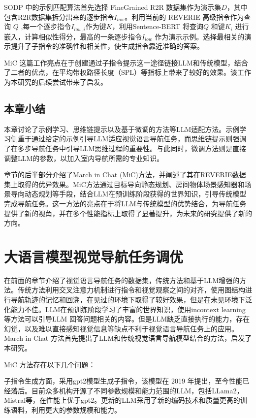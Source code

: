 \documentclass[bachelor]{thesis-uestc}
\begin{document}
SODP 中的示例匹配算法首先选择 FineGrained R2R 数据集作为演示集$D$，其中包含R2R数据集拆分出来的逐步指令$I_{low}$。利用当前的 REVERIE 高级指令作为查询 $Q$ ,每一个逐步指令$I_{low,i}$作为键$K$，利用Sentence-BERT 将查询$Q$ 和键$K_i$ 进行嵌入，计算相似性得分，最高的一条逐步指令$I_{low}$ 作为演示示例。选择最相关的演示提升了子指令的准确性和相关性，使生成指令靠近准确的答案。

MiC 这篇工作亮点在于创建通过子指令提示这一途径链接LLM和传统模型，结合了二者的优点，在平均带权路径长度（SPL）等指标上带来了较好的效果。该工作为本研究的后续尝试带来了启发。

\section{本章小结}
本章讨论了示例学习、思维链提示以及基于微调的方法等LLM适配方法。示例学习侧重于通过给定的示例引导LLM适应视觉语言导航任务，而思维链提示则强调了在多步导航任务中引导LLM思维过程的重要性。与此同时，微调方法则是直接调整LLM的参数，以加入室内导航所需的专业知识。

章节的后半部分介绍了March in Chat (MiC)方法，并阐述了其在REVERIE数据集上取得的优异效果。MiC方法通过目标导向静态规划、房间物体场景感知器和场景导向动态规划等手段，结合LLM在预训练阶段获得的世界知识，引导传统模型完成导航任务。这一方法的亮点在于将LLM与传统模型的优势结合，为导航任务提供了新的视角，并在多个性能指标上取得了显著提升，为未来的研究提供了新的方向。

\chapter{大语言模型视觉导航任务调优}

在前面的章节介绍了视觉语言导航任务的数据集，传统方法和基于LLM增强的方法。传统方法利用交叉注意力机制进行指令和视觉观察之间的对齐，使用图结构进行导航轨迹的记忆和回溯，在见过的环境下取得了较好效果，但是在未见环境下泛化能力不佳。LLM在预训练阶段学习了丰富的世界知识，使用incontext learning等方法可以引导LLM 回答问题相关的内容。但是LLM缺乏直接执行的能力，存在幻觉，以及难以直接感知视觉信息等缺点不利于视觉语言导航任务上的应用。March in Chat 方法首先提出了LLM和传统视觉语言导航模型结合的方法，启发了本研究。

MiC 方法存在以下几个问题：

子指令生成方面，采用gpt2模型生成子指令，该模型在 2019 年提出，至今性能已经落后。目前众多机构开源了不同参数规模和能力范围的LLM，包括LLama2，Mistral等，在性能上优于gpt2。更新的LLM采用了新的编码技术和质量更高的训练语料，利用更大的参数规模和能力。
\end{document}
